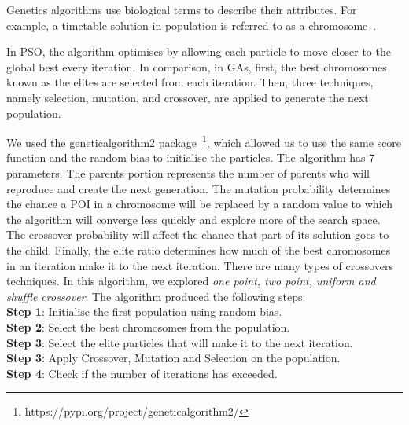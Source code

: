 Genetics algorithms use biological terms to describe
their attributes. For example, a timetable solution in
population is referred to as a chromosome~\cite{Abbaspour2011}. 

In PSO, the algorithm optimises by allowing each
particle to move closer to the global best every
iteration. In comparison, in GAs, first, the best
chromosomes known as the elites are selected from each
iteration. Then, three techniques, namely selection,
mutation, and crossover, are applied to generate the
next population.

We used the geneticalgorithm2 package~\footnote{https://pypi.org/project/geneticalgorithm2/},
which allowed us to use the same score function and
the random bias to initialise the particles. The
algorithm has 7 parameters. The parents portion
represents the number of parents who will reproduce
and create the next generation. The mutation
probability determines the chance a POI in a
chromosome will be replaced by a random value to which
the algorithm will converge less quickly and explore
more of the search space. The crossover probability
will affect the chance that part of its solution goes
to the child. Finally, the elite ratio determines how
much of the best chromosomes in an iteration make it
to the next iteration.  There are many types of
crossovers techniques. In this algorithm, we
explored \textit{one point, two point, uniform and shuffle crossover}.  The algorithm produced the following
steps: \\
\textbf{Step 1}: Initialise the first population using random bias. \\
\textbf{Step 2}: Select the best chromosomes from the population. \\ 
\textbf{Step 3}: Select the elite particles that will make it to the next iteration.\\
\textbf{Step 3}: Apply Crossover, Mutation and Selection on the population. \\
\textbf{Step 4}: Check if the number of iterations has exceeded. 


